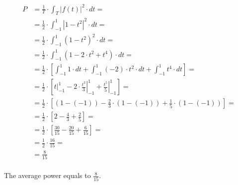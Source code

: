 \begin{task}
\begin{align*}
	P&=\frac{1}{T} \cdot \int_{T}\left|f(t)\right|^2 \cdot dt =\\
	&=\frac{1}{2} \cdot  \int_{-1}^{1}\left| 1-t^2 \right|^2 \cdot dt =\\
    &=\frac{1}{2} \cdot  \int_{-1}^{1}\left(1-t^2\right)^2 \cdot dt =\\
    &=\frac{1}{2} \cdot  \int_{-1}^{1}\left(1-2 \cdot t^2 + t^4\right) \cdot dt =\\
    &=\frac{1}{2} \cdot \left[ \int_{-1}^{1} 1 \cdot dt +\int_{-1}^{1} (-2) \cdot t^2 \cdot dt +\int_{-1}^{1} t^4 \cdot dt\right]=\\
    &=\frac{1}{2} \cdot \left[ \left. t \right|_{-1}^{1} -2 \cdot \left. \frac{t^3}{3}\right|_{-1}^{1} +\left. \frac{t^5}{5}\right|_{-1}^{1}\right]=\\
    &=\frac{1}{2} \cdot \left[ (1-(-1)) -\frac{2}{3} \cdot (1-(-1)) +\frac{1}{5} \cdot (1-(-1))\right]=\\
    &=\frac{1}{2} \cdot \left[ 2 -\frac{4}{3} +\frac{2}{5}\right]=\\
    &=\frac{1}{2} \cdot \left[ \frac{30}{15} -\frac{20}{15} +\frac{6}{15}\right]=\\
    &=\frac{1}{2} \cdot \frac{16}{15}=\\
    &=\frac{8}{15}\\
\end{align*}

The average power equals to $\frac{8}{15}$.
\end{task}
